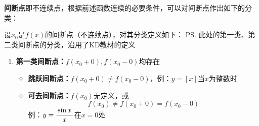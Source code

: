 {\bf 间断点}即不连续点，根据前述函数连续的必要条件，可以对间断点作出如下的分类：

设$x_0$是$f(x)$的间断点（不连续点），对其分类定义如下：
\ps{此处的第一类、第二类间断点的分类，沿用了KD教材的定义}
\begin{enumerate}[(1)]
  \setlength{\itemindent}{1cm}
  \item {\bf 第一类间断点：}$f(x_0+0),f(x_0-0)$均存在
  \begin{itemize}
    \item {\bf 跳跃间断点：}$f(x_0+0)\ne f(x_0-0)$，例：$y=[x]$当$x$为整数时
    \begin{center}
 	\end{center}
    \item {\bf 可去间断点：}$f(x_0)$无定义，或
    $$f(x_0)\ne f(x_0+0)=f(x_0-0)$$
    例：$y=\displaystyle\frac{\,{\sin x}\,}{\,{x}\,}$在$x=0$处
    \begin{center}

\end{center}
\end{itemize}
\end{enumerate}
